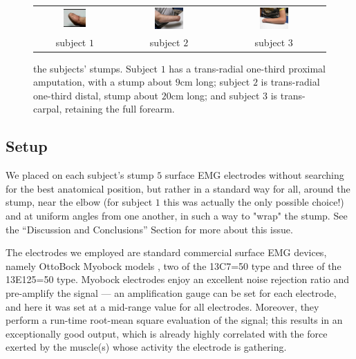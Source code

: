 \begin{figure}[!ht] \centering
  \begin{tabular}{ccc}
    \includegraphics[width=0.3\textwidth]{figs/stump_1} &
    \includegraphics[width=0.3\textwidth]{figs/stump_2} &
    \includegraphics[width=0.3\textwidth]{figs/stump_3} \\
    subject $1$ & subject $2$ & subject $3$ \\
  \end{tabular}
  \caption{the subjects' stumps. Subject $1$ has a trans-radial
    one-third proximal amputation, with a stump about $9$cm long;
    subject $2$ is trans-radial one-third distal, stump about $20$cm
    long; and subject $3$ is trans-carpal, retaining the full
    forearm.}
  \label{fig:stumps}
\end{figure}

\subsection{Setup}

We placed on each subject's stump $5$ surface EMG electrodes without
searching for the best anatomical position, but rather in a standard
way for all, around the stump, near the elbow (for subject $1$ this
was actually the only possible choice!) and at uniform angles from one
another, in such a way to "wrap" the stump. See the ``Discussion and
Conclusions'' Section for more about this issue.

The electrodes we employed are standard commercial surface EMG
devices, namely OttoBock Myobock models \cite{ottobock}, two of the
13C7=50 type and three of the 13E125=50 type. Myobock electrodes enjoy
an excellent noise rejection ratio and pre-amplify the signal --- an
amplification gauge can be set for each electrode, and here it was set
at a mid-range value for all electrodes. Moreover, they perform a
run-time root-mean square evaluation of the signal; this results in an
exceptionally good output, which is already highly correlated with the
force exerted by the muscle(s) whose activity the electrode is
gathering.

